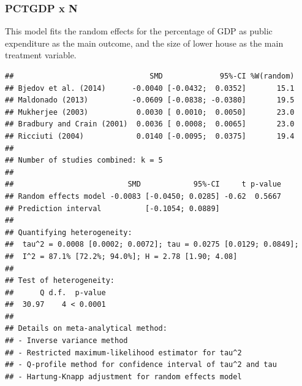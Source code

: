 \documentclass[
]{article}
\newenvironment{Shaded}{\begin{snugshade}}{\end{snugshade}}
\newcommand{\CommentTok}[1]{\textcolor[rgb]{0.56,0.35,0.01}{\textit{#1}}}
\newcommand{\DataTypeTok}[1]{\textcolor[rgb]{0.13,0.29,0.53}{#1}}
\newcommand{\KeywordTok}[1]{\textcolor[rgb]{0.13,0.29,0.53}{\textbf{#1}}}
\newcommand{\NormalTok}[1]{#1}
\newcommand{\OperatorTok}[1]{\textcolor[rgb]{0.81,0.36,0.00}{\textbf{#1}}}
\newcommand{\OtherTok}[1]{\textcolor[rgb]{0.56,0.35,0.01}{#1}}
\newcommand{\StringTok}[1]{\textcolor[rgb]{0.31,0.60,0.02}{#1}}
\begin{document}
\newpage

\hypertarget{pctgdp-x-n}{%
\subsubsection{PCTGDP x N}\label{pctgdp-x-n}}

This model fits the random effects for the percentage of GDP as public
expenditure as the main outcome, and the size of lower house as the main
treatment variable.

\begin{Shaded}
\end{Shaded}

\begin{verbatim}
##                               SMD             95%-CI %W(random)
## Bjedov et al. (2014)      -0.0040 [-0.0432;  0.0352]       15.1
## Maldonado (2013)          -0.0609 [-0.0838; -0.0380]       19.5
## Mukherjee (2003)           0.0030 [ 0.0010;  0.0050]       23.0
## Bradbury and Crain (2001)  0.0036 [ 0.0008;  0.0065]       23.0
## Ricciuti (2004)            0.0140 [-0.0095;  0.0375]       19.4
## 
## Number of studies combined: k = 5
## 
##                          SMD            95%-CI     t p-value
## Random effects model -0.0083 [-0.0450; 0.0285] -0.62  0.5667
## Prediction interval          [-0.1054; 0.0889]              
## 
## Quantifying heterogeneity:
##  tau^2 = 0.0008 [0.0002; 0.0072]; tau = 0.0275 [0.0129; 0.0849];
##  I^2 = 87.1% [72.2%; 94.0%]; H = 2.78 [1.90; 4.08]
## 
## Test of heterogeneity:
##      Q d.f.  p-value
##  30.97    4 < 0.0001
## 
## Details on meta-analytical method:
## - Inverse variance method
## - Restricted maximum-likelihood estimator for tau^2
## - Q-profile method for confidence interval of tau^2 and tau
## - Hartung-Knapp adjustment for random effects model
\end{verbatim}
\end{document}
